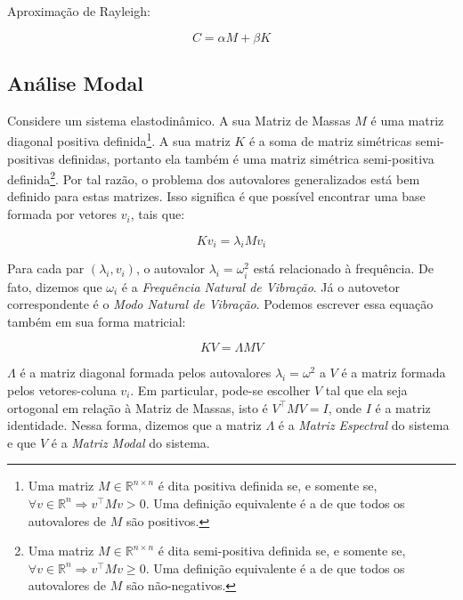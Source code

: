 Aproximação de Rayleigh:

\begin{equation}
C = \alpha M + \beta{K}
\label{rayleighdamping}
\end{equation}


\subsection{Análise Modal}

Considere um sistema elastodinâmico. A sua Matriz de Massas $M$ é uma matriz diagonal positiva definida\footnote{Uma matriz $M \in \mathbb{R}^{n\times n}$ é dita positiva definida se, e somente se, $\forall v \in \mathbb{R}^n \Rightarrow v^\intercal M v > 0$. Uma definição equivalente é a de que todos os autovalores de $M$ são positivos.}. A sua matriz $K$ é a soma de matriz simétricas semi-positivas definidas, portanto ela também é uma matriz simétrica semi-positiva definida\footnote{Uma matriz $M \in \mathbb{R}^{n\times n}$ é dita semi-positiva definida se, e somente se, $\forall v \in \mathbb{R}^n \Rightarrow v^\intercal M v \ge 0$. Uma definição equivalente é a de que todos os autovalores de $M$ são não-negativos.}. Por tal razão, o problema dos autovalores generalizados está bem definido para estas matrizes\cite{parlett1980symmetric}. Isso significa é que possível encontrar uma base formada por vetores $v_i$, tais que:

\begin{equation}
	Kv_i = \lambda_i M v_i
\end{equation}

Para cada par $(\lambda_i, v_i)$, o autovalor $\lambda_i = \omega_i^2$ está relacionado à frequência. De fato, dizemos que $\omega_i$ é a \emph{Frequência Natural de Vibração}. Já o autovetor correspondente é o \emph{Modo Natural de Vibração}. Podemos escrever essa equação também em sua forma matricial:

\begin{equation}
	KV = \Lambda M V
	\label{modematrix}
\end{equation}

$\Lambda$ é a matriz diagonal formada pelos autovalores $\lambda_i = \omega^2$ a $V$ é a matriz formada pelos vetores-coluna $v_i$. Em particular, pode-se escolher $V$ tal que ela seja ortogonal em relação à Matriz de Massas, isto é $V^\intercal M V = I$, onde $I$ é a matriz identidade. Nessa forma, dizemos que a matriz $\Lambda$ é a \emph{Matriz Espectral} do sistema e que $V$ é a \emph{Matriz Modal} do sistema.


